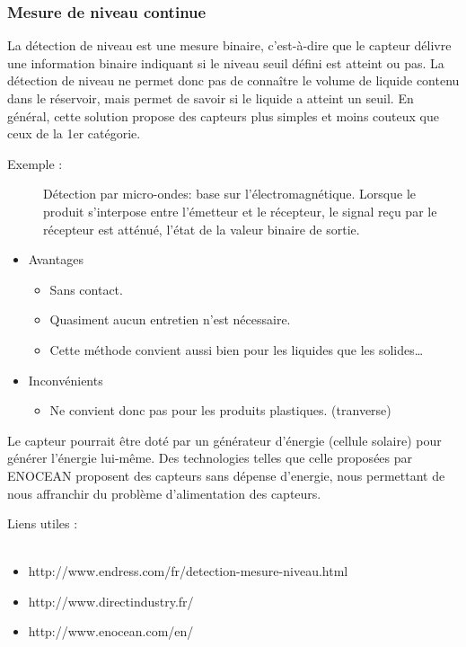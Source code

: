 	\subsubsection {Mesure de niveau continue}
	La détection de niveau est une mesure binaire, c'est-à-dire que le capteur délivre une information binaire indiquant si le niveau seuil défini est atteint ou 		pas. La détection de niveau ne permet donc pas de connaître le volume de liquide contenu dans le réservoir, mais permet de savoir si le liquide a atteint un 		seuil. En général, cette solution propose des capteurs plus simples et moins couteux que ceux de la 1er catégorie.

	\begin {description}
		\item [Exemple :]
	Détection par micro-ondes: base sur l’électromagnétique. Lorsque le produit s'interpose entre l'émetteur et le récepteur, le signal reçu par le récepteur est atténué,  l'état de la valeur binaire de sortie.
	\end {description}
	\begin {itemize}
		\item Avantages 
		\begin {itemize}
			\item Sans contact. 
			\item Quasiment aucun entretien n'est nécessaire. 
			\item Cette méthode convient aussi bien pour les liquides que les solides…
		\end {itemize}
		\item Inconvénients
		\begin {itemize}
			\item Ne convient donc pas pour les produits plastiques. (tranverse)
		\end {itemize}
	\end {itemize}

Le capteur pourrait être doté par un générateur d'énergie (cellule solaire) pour générer l'énergie lui-même. Des technologies telles que celle proposées par ENOCEAN proposent des capteurs sans dépense d'energie, nous permettant de nous affranchir du problème d'alimentation des capteurs.


Liens utiles : \\~
\begin {itemize}
	\item http://www.endress.com/fr/detection-mesure-niveau.html
	\item http://www.directindustry.fr/
	\item http://www.enocean.com/en/
\end {itemize}
